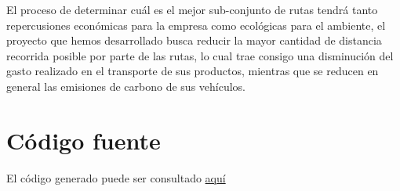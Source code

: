 \documentclass[journal]{IEEEtran}
\begin{document}
        El proceso de determinar cuál es el mejor sub-conjunto de rutas tendrá tanto repercusiones económicas para la empresa como ecológicas para el ambiente, el proyecto que hemos desarrollado busca reducir la mayor cantidad de distancia recorrida posible por parte de las rutas, lo cual trae consigo una disminución del gasto realizado en el transporte de sus productos, mientras que se reducen en general las emisiones de carbono de sus vehículos.
        
    \appendices
    
    \section{Código fuente}\label{code}
    
        El código generado puede ser consultado \href{https://github.com/JuanEcheagaray75/capacitated-vrp}{aquí}
    
    
    
\end{document}
